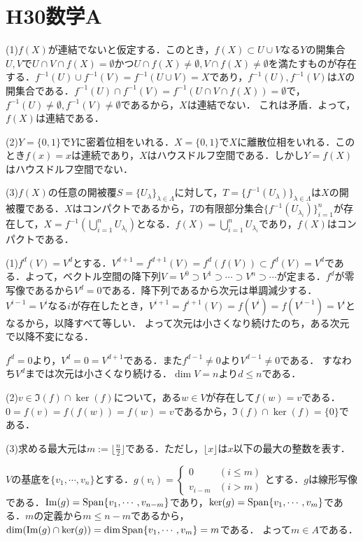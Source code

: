 \documentclass[
		book,
		head_space=20mm,
		foot_space=20mm,
		gutter=10mm,
		line_length=190mm
]{jlreq}
\begin{document}
\section{H30数学A}
(1)$f(X)$が連結でないと仮定する．このとき，$f(X)\subset U \cup V$なる$Y$の開集合$U,V$で$U\cap V\cap f(X)=\emptyset$かつ$U\cap f(X)\neq \emptyset, V\cap f(X)\neq \emptyset$を満たすものが存在する．$f^{-1}(U)\cup f^{-1}(V)=f^{-1}(U\cup V)=X$であり，$f^{-1}(U),f^{-1}(V)$は$X$の開集合である．$f^{-1}(U)\cap f^{-1}(V)=f^{-1}(U\cap V\cap f(X))=\emptyset$で，$f^{-1}(U)\neq \emptyset, f^{-1}(V)\neq \emptyset$であるから，$X$は連結でない．
これは矛盾．よって，$f(X)$は連結である．

(2)$Y=\{0,1\}$で$Y$に密着位相をいれる．$X=\{0,1\}$で$X$に離散位相をいれる．このとき$f(x)=x$は連続であり，$X$はハウスドルフ空間である．しかし$Y=f(X)$はハウスドルフ空間でない．

(3)$f(X)$の任意の開被覆$S=\{U_{\lambda}\}_{\lambda\in \Lambda}$に対して，$T=\{f^{-1}(U_{\lambda})\}_{\lambda\in \Lambda}$は$X$の開被覆である．$X$はコンパクトであるから，$T$の有限部分集合$\{f^{-1}(U_{\lambda_i})\}_{i=1}^n$が存在して，$X=f^{-1}(\bigcup_{i=1}^n U_{\lambda_i})$となる．$f(X)=\bigcup_{i=1}^n U_{\lambda_i}$であり，$f(X)$はコンパクトである．

(1)$f^d(V)=V^d$とする．$V^{d+1}=f^{d+1}(V)=f^d(f(V))\subset f^d(V)=V^d$である．よって，ベクトル空間の降下列$V=V^0\supset V^1\supset \cdots \supset V^n \supset \cdots$が定まる．$f^d$が零写像であるから$V^d=0$である．降下列であるから次元は単調減少する．
$V^{i-1}=V^{i}$なる$i$が存在したとき，$V^{i+1}=f^{i+1}(V)=f(V^i)=f(V^{i-1})=V^i$となるから，以降すべて等しい．
よって次元は小さくなり続けたのち，ある次元で以降不変になる．

$f^d=0$より，$V^d=0=V^{d+1}$である．また$f^{d-1}\neq 0$より$V^{d-1}\neq 0$である．
すなわち$V^d$までは次元は小さくなり続ける．$\dim V=n$より$d\le n$である．

(2)$v \in \Im(f)\cap \ker (f)$について，ある$w\in V$が存在して$f(w)=v$である．$0=f(v)=f(f(w))=f(w)=v$であるから，$\Im(f)\cap \ker (f)=\{0\}$である．

(3)求める最大元は$m:=\lfloor \frac{n}{2} \rfloor$である．ただし，$\lfloor x \rfloor$は$x$以下の最大の整数を表す．

$V$の基底を$\{v_1,\cdots,v_n\}$とする．$g(v_i)=\begin{cases}
	0 & (i\le m)\\
	v_{i-m} & (i>m)
\end{cases}$とする．$g$は線形写像である．$\mathop{\mathrm{Im}} (g)=\mathop{\mathrm{Span}}\{v_{1},\cdots,v_{n-m}\}$であり，$\ker (g)=\mathop{\mathrm{Span}}\{v_1,\cdots,v_m\}$である．$m$の定義から$m\le n-m$であるから，$\dim(\mathop{\mathrm{Im}} (g)\cap \ker (g))=\dim \mathop{\mathrm{Span}}\{v_1,\cdots,v_m\}=m$である．
よって$m \in A$である．
\end{document}
